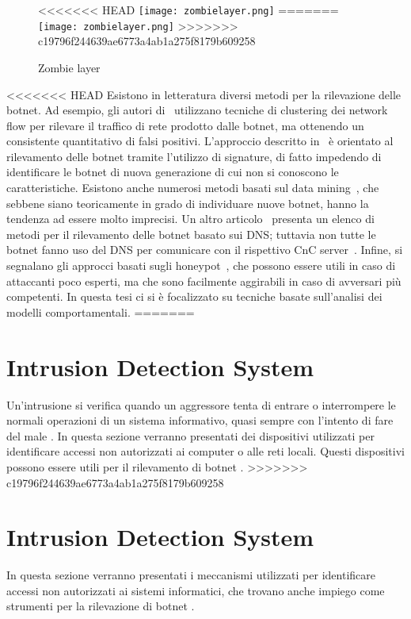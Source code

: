 \documentclass[../main.tex]{subfiles}
\begin{document}
\begin{figure}[H]
				\centering
<<<<<<< HEAD
				\texttt{[image: zombielayer.png]}
=======
				\texttt{[image: zombielayer.png]}
>>>>>>> c19796f244639ae6773a4ab1a275f8179b609258
				\caption{Zombie layer}
				\label{fig:zombieLayer}
\end{figure}

<<<<<<< HEAD
Esistono in letteratura diversi metodi per la rilevazione delle botnet. Ad esempio, gli autori di~\cite{netflowbotnetdetection} utilizzano tecniche di clustering dei network flow per rilevare il traffico di rete prodotto dalle botnet, ma ottenendo un consistente quantitativo di falsi positivi. L'approccio descritto in~\cite{signaturebotnetdetection} è orientato al rilevamento delle botnet tramite l'utilizzo di signature, di fatto impedendo di identificare le botnet di nuova generazione di cui non si conoscono le caratteristiche. Esistono anche numerosi metodi basati sul data mining~\cite{dataminingbotnetdetection}, che sebbene siano teoricamente in grado di individuare nuove botnet, hanno la tendenza ad essere molto imprecisi. Un altro articolo~\cite{dnsbotnetdetection} presenta un elenco di metodi per il rilevamento delle botnet basato sui DNS; tuttavia non tutte le botnet fanno uso del DNS per comunicare con il rispettivo CnC server~\cite{brown2010resilient}. Infine, si segnalano gli approcci basati sugli honeypot~\cite{honeypotbotnetdetection}, che possono essere utili in caso di attaccanti poco esperti, ma che sono facilmente aggirabili in caso di avversari più competenti. In questa tesi ci si è focalizzato su tecniche basate sull'analisi dei modelli comportamentali.
=======
\section{Intrusion Detection System}
Un'intrusione si verifica quando un aggressore tenta di entrare o interrompere le normali operazioni di un sistema informativo, quasi sempre con l'intento di fare del male \cite{idsbook}.
In questa sezione verranno presentati dei dispositivi utilizzati per identificare accessi non autorizzati ai computer o alle reti locali. Questi dispositivi possono essere utili per il rilevamento di botnet \cite{botnetdetection}.
>>>>>>> c19796f244639ae6773a4ab1a275f8179b609258


\section{Intrusion Detection System}
In questa sezione verranno presentati i meccanismi utilizzati per identificare accessi non autorizzati ai sistemi informatici, che trovano anche impiego come strumenti per la rilevazione di botnet \cite{botnetdetection}.
\end{document}
